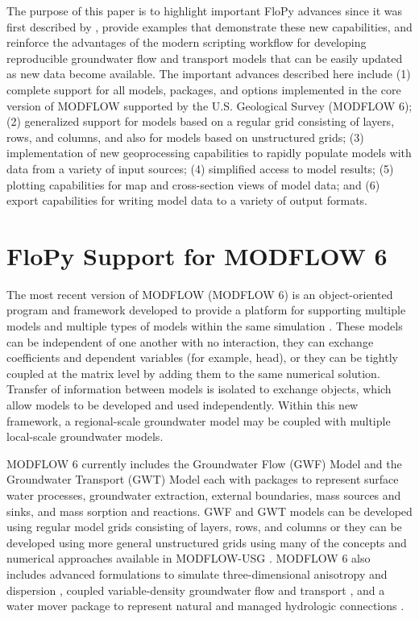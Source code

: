 \documentclass[11pt, oneside]{article}  	%
\begin{document}
The purpose of this paper is to highlight important FloPy advances since it was first described by \cite{bakker2016scripting}, provide examples that demonstrate these new capabilities, and reinforce the advantages of the modern scripting workflow for developing reproducible groundwater flow and transport models that can be easily updated as new data become available. The important advances described here include (1) complete support for all models, packages, and options implemented in the core version of MODFLOW supported by the U.S. Geological Survey (MODFLOW 6); (2) generalized support for models based on a regular grid consisting of layers, rows, and columns, and also for models based on unstructured grids; (3) implementation of new geoprocessing capabilities to rapidly populate models with data from a variety of input sources; (4) simplified access to model results; (5) plotting capabilities for map and cross-section views of model data; and (6) export capabilities for writing model data to a variety of output formats.


\section{FloPy Support for MODFLOW 6}

The most recent version of MODFLOW (MODFLOW 6) is an object-oriented program and framework developed to provide a platform for supporting multiple models and multiple types of models within the same simulation \citep{modflow6gwf, modflow6framework, morway2021use}. These models can be independent of one another with no interaction, they can exchange coefficients and dependent variables (for example, head), or they can be tightly coupled at the matrix level by adding them to the same numerical solution. Transfer of information between models is isolated to exchange objects, which allow models to be developed and used independently. Within this new framework, a regional-scale groundwater model may be coupled with multiple local-scale groundwater models. 

MODFLOW 6 currently includes the Groundwater Flow (GWF) Model and the Groundwater Transport (GWT) Model each with packages to represent surface water processes, groundwater extraction, external boundaries, mass sources and sinks, and mass sorption and reactions. GWF and GWT models can be developed using regular model grids consisting of layers, rows, and columns or they can be developed using more general unstructured grids using many of the concepts and numerical approaches available in MODFLOW-USG \citep{modflowusg}. MODFLOW 6 also includes advanced formulations to simulate three-dimensional anisotropy and dispersion \citep{modflow6xt3d}, coupled variable-density groundwater flow and transport \citep{langevin2020hydraulic}, and a water mover package to represent natural and managed hydrologic connections \citep{morway2021use}.
\end{document}
